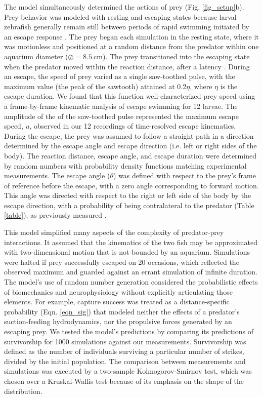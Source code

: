 \documentclass[]{rsos}%
\begin{document}
The model simultaneously determined the actions of prey (Fig. \ref{fig_setup}b).
Prey behavior was modeled with resting and escaping states because larval zebrafish generally remain still between periods of rapid swimming initiated by an escape response \cite{Stewart:2013bha, Stewart:2014cma}. 
The prey began each simulation in the resting state, where it was motionless and positioned at a random distance from the predator within one aquarium diameter ($\oslash = \SI{8.5}{\cm}$).
The prey transitioned into the escaping state when the predator moved within the reaction distance, after a latency \cite{Nair:2015gk}.
During an escape, the speed of prey varied as a single saw-toothed pulse, with the maximum value (the peak of the sawtooth) attained at 0.2$\eta$, where $\eta$ is the escape duration. 
We found that this function well-characterized prey speed using a frame-by-frame kinematic analysis of escape swimming for 12 larvae. 
The amplitude of the of the saw-toothed pulse represented the maximum escape speed, $u$, observed in our 12 recordings of time-resolved escape kinematics.
During the escape, the prey was assumed to follow a straight path in a direction determined by the escape angle and escape direction (i.e. left or right sides of the body).
The reaction distance, escape angle, and escape duration were determined by random numbers with probability density functions matching experimental measurements.
The escape angle ($\theta$) was defined with respect to the prey's frame of reference before the escape, with a zero angle corresponding to forward motion.
This angle was directed with respect to the right or left side of the body by the escape direction, with a probability of being contralateral to the predator (Table \ref{table}), as previously measured \cite{Stewart:2014cma}.

This model simplified many aspects of the complexity of predator-prey interactions.
It assumed that the kinematics of the two fish may be approximated with two-dimensional motion that is not bounded by an aquarium. 
Simulations were halted if prey successfully escaped on 20 occasions, which reflected the observed maximum and guarded against an errant simulation of infinite duration.
The model's use of random number generation considered the probabilistic effects of biomechanics and neurophysiology without explicitly articulating those elements.
For example, capture success was treated as a distance-specific probability (Eqn. \ref{eqn_sig}) that modeled neither the effects of a predator's suction-feeding hydrodynamics, nor the propulsive forces generated by an escaping prey.
We tested the model's predictions by comparing its predictions of survivorship for 1000 simulations against our measurements.
Survivorship was defined as the number of individuals surviving a particular number of strikes, divided by the initial population.
The comparison between measurements and simulations was executed by a two-sample Kolmogorov-Smirnov test, which was chosen over a Kruskal-Wallis test because of its emphasis on the shape of the distribution.  
\end{document}
